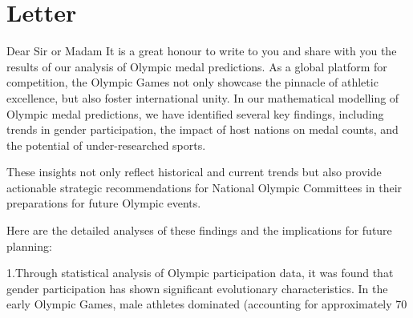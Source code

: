 \documentclass{mcmthesis}
\begin{document}
\section{Letter}
Dear Sir or Madam
It is a great honour to write to you and share with you the results of our analysis of Olympic medal predictions. As a global platform for competition, the Olympic Games not only showcase the pinnacle of athletic excellence, but also foster international unity. In our mathematical modelling of Olympic medal predictions, we have identified several key findings, including trends in gender participation, the impact of host nations on medal counts, and the potential of under-researched sports.

These insights not only reflect historical and current trends but also provide actionable strategic recommendations for National Olympic Committees in their preparations for future Olympic events. 

Here are the detailed analyses of these findings and the implications for future planning:

1.Through statistical analysis of Olympic participation data, it was found that gender participation has shown significant evolutionary characteristics. In the early Olympic Games, male athletes dominated (accounting for approximately 70%
\end{document}
